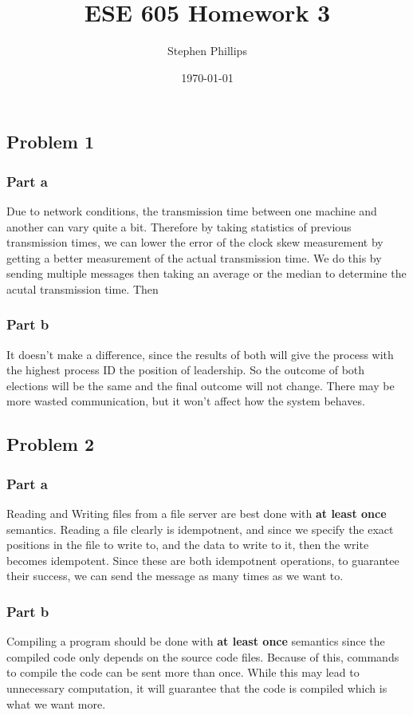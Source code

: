 \documentclass[english]{article}
\title{ESE 605 Homework 3}
\author{Stephen Phillips}
\date{\today }
\begin{document}
\maketitle
\subsection*{Problem 1}
\subsubsection*{Part a}
Due to network conditions, the transmission time between one machine and 
another can vary quite a bit. Therefore by taking statistics of previous
transmission times, we can lower the error of the clock skew measurement
by getting a better measurement of the actual transmission time. We do this by
sending multiple messages then taking an average or the median to determine
the acutal transmission time. Then 


\subsubsection*{Part b}
It doesn't make a difference, since the results of both will give the process
with the highest process ID the position of leadership. So the outcome of
both elections will be the same and the final outcome will not change. There
may be more wasted communication, but it won't affect how the system behaves.


\subsection*{Problem 2}
\subsubsection*{Part a}
Reading and Writing files from a file server are best done with
\textbf{at least once} semantics. Reading a file clearly is idempotnent, and 
since we specify the exact positions in the file to write to, and the data
to write to it, then the write becomes idempotent. Since these are both
idempotnent operations, to guarantee their success, we can send the message
as many times as we want to.

\subsubsection*{Part b}
Compiling a program should be done with \textbf{at least once} semantics since
the compiled code only depends on the source code files. Because of this,
commands to compile the code can be sent more than once. While this may lead
to unnecessary computation, it will guarantee that the code is compiled which
is what we want more.
\end{document}
